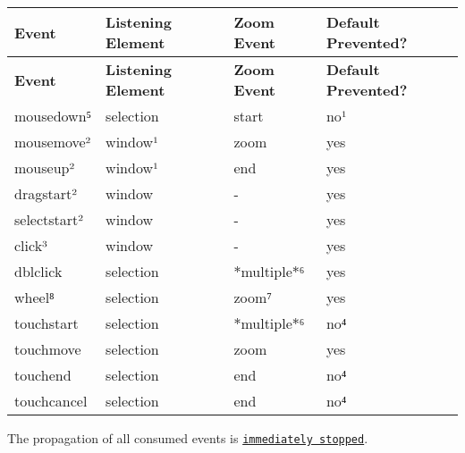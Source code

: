 \tabulinesep=1mm
\begin{longtabu} spread 0pt [c]{*{4}{|X[-1]}|}
\hline
\rowcolor{\tableheadbgcolor}\textbf{ Event  }&\textbf{ Listening Element  }&\textbf{ Zoom Event  }&\textbf{ Default Prevented?   }\\
\endfirsthead
\hline
\endfoot
\hline
\rowcolor{\tableheadbgcolor}\textbf{ Event  }&\textbf{ Listening Element  }&\textbf{ Zoom Event  }&\textbf{ Default Prevented?   }\\
\endhead
mousedown⁵  &selection  &start  &no¹   \\
mousemove²  &window¹  &zoom  &yes   \\
mouseup²  &window¹  &end  &yes   \\
dragstart²  &window  &-\/  &yes   \\
selectstart²  &window  &-\/  &yes   \\
click³  &window  &-\/  &yes   \\
dblclick  &selection  &$\ast$multiple$\ast$⁶  &yes   \\
wheel⁸  &selection  &zoom⁷  &yes   \\
touchstart  &selection  &$\ast$multiple$\ast$⁶  &no⁴   \\
touchmove  &selection  &zoom  &yes   \\
touchend  &selection  &end  &no⁴   \\
touchcancel  &selection  &end  &no⁴   \\
\end{longtabu}


The propagation of all consumed events is \href{https://dom.spec.whatwg.org/#dom-event-stopimmediatepropagation}{\tt immediately stopped}.

